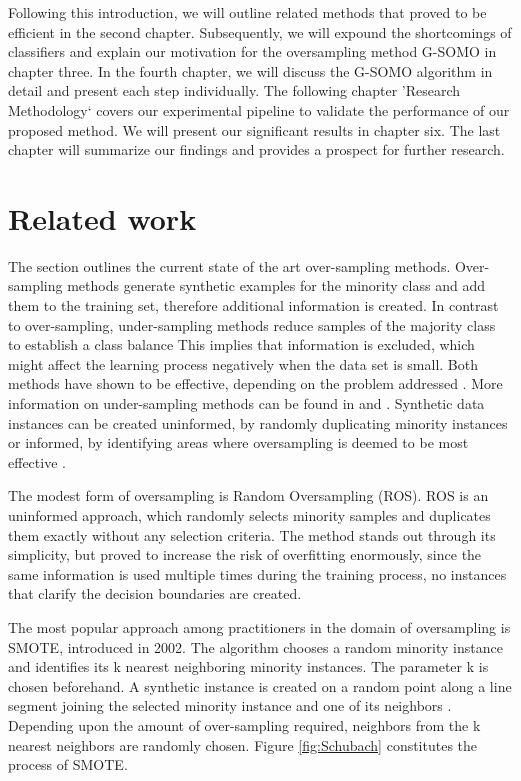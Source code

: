 \documentclass[parskip=full]{scrartcl}
\begin{document}
Following this introduction, we will outline related methods that proved to be efficient in the second chapter. 
Subsequently, we will expound the shortcomings of classifiers and explain our motivation for the oversampling 
method G-SOMO in chapter three. In the fourth chapter, we will discuss the G-SOMO algorithm in detail and 
present each step individually. The following chapter 'Research Methodology‘ covers our experimental pipeline 
to validate the performance of our proposed method. We will present our significant results in chapter six. 
The last chapter will summarize our findings and provides a prospect for further research.

\section{Related work}

The section outlines the current state of the art over-sampling methods. Over-sampling methods generate 
synthetic examples for the minority class and add them to the training set, therefore additional information 
is created. In contrast to over-sampling, under-sampling methods reduce samples of the majority class to 
establish a class balance This implies that information is excluded, which might affect the learning process 
negatively when the data set is small. Both methods have shown to be effective, depending on the problem 
addressed \cite{Chawla2002}. More information on under-sampling methods can be found in \cite{Ganganwar2012} 
and \cite{Yen2006}. Synthetic data instances can be created uninformed, by randomly duplicating minority 
instances or informed, by identifying areas where oversampling is deemed to be most effective \cite{Last2017}. 

The modest form of oversampling is Random Oversampling (ROS). ROS is an uninformed approach, which randomly 
selects minority samples and duplicates them exactly without any selection criteria. The method stands out 
through its simplicity, but proved to increase the risk of overfitting enormously, since the same information 
is used multiple times during the training process, no instances that clarify the decision boundaries are created. 

The most popular approach among practitioners in the domain of oversampling is SMOTE, introduced in 2002. The 
algorithm chooses a random minority instance and identifies its k nearest neighboring minority instances. The 
parameter k is chosen beforehand. A synthetic instance is created on a random point along a line segment joining 
the selected minority instance and one of its neighbors \cite{Chawla2002}.  Depending upon the amount of 
over-sampling required, neighbors from the k nearest neighbors are randomly chosen. Figure \ref{fig:Schubach} 
constitutes the process of SMOTE.
\end{document}
